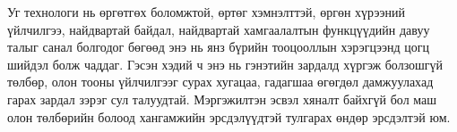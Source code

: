 Уг технологи нь өргөтгөх боломжтой, өртөг хэмнэлттэй, өргөн хүрээний үйлчилгээ, найдвартай байдал, найдвартай хамгаалалтын функцүүдийн давуу талыг санал болгодог бөгөөд энэ нь янз бүрийн тооцооллын хэрэгцээнд цогц шийдэл болж чаддаг. Гэсэн хэдий ч энэ нь гэнэтийн зардалд хүргэж болзошгүй төлбөр, олон тооны үйлчилгээг сурах хугацаа, гадагшаа өгөгдөл дамжуулахад гарах зардал зэрэг сул талуудтай. Мэргэжилтэн эсвэл хяналт байхгүй бол маш олон төлбөрийн болоод хангамжийн эрсдэлүүдтэй тулгарах өндөр эрсдэлтэй юм.